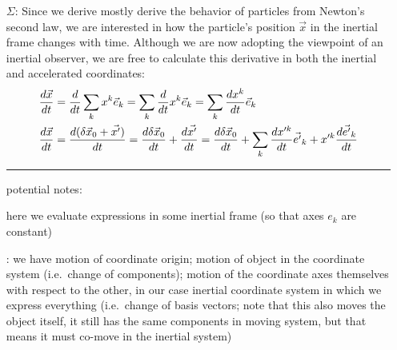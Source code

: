 \documentclass[../class_mech_main.tex]{subfiles}
\begin{document}
\begin{itemize}
	\item[$\Sigma$:] Since we derive mostly derive the behavior of particles from Newton's second law, we are interested in how the particle's position $\vec{x}$ in the inertial frame changes with time. Although we are now adopting the viewpoint of an inertial observer, we are free to calculate this derivative in both the inertial and accelerated coordinates:
	\begin{align}
		\dv{\vec{x}}{t} &= \dv{t} \sum_k x^k \vec{e}_k
		= \sum_k \dv{t} x^k \vec{e}_k
		= \sum_k \dv{x^k}{t} \vec{e}_k
		\label{eq:velocity_from_inert_frame_in_inert_frame}
		\\
		\dv{\vec{x}}{t} &= \dv{(\delta \vec{x}_0 + \vec{x'})}{t}
		= \dv{\delta \vec{x}_0}{t} + \dv{\vec{x'}}{t}
		= \dv{\delta \vec{x}_0}{t} + \sum_k \dv{x'^k}{t} \vec{e'}_k + x'^k \dv{\vec{e'}_k}{t}
		\label{eq:velocity_from_inert_frame_in_accel_frame}
	\end{align}

	\hrule

	potential notes:

	here we evaluate expressions in some inertial frame (so that axes $e_k$ are constant)

	: we have motion of coordinate origin; motion of object in the coordinate system (i.e.~change of components); motion of the coordinate axes themselves with respect to the other, in our case inertial coordinate system in which we express everything (i.e.~change of basis vectors; note that this also moves the object itself, it still has the same components in moving system, but that means it must co-move in the inertial system)





\end{itemize}
\end{document}
